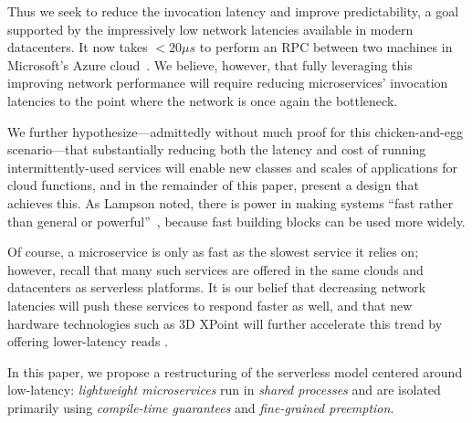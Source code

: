 Thus we seek to reduce the invocation latency and improve predictability, a
goal supported by the impressively low network latencies available in
modern datacenters. It
now takes $<20\mu{}s$ to perform an RPC between two machines in Microsoft's Azure
cloud~\cite{www-firestone-azure-latency}.    We believe, however, that fully leveraging this
improving network performance will require reducing microservices' invocation
latencies to the point where the network is once again the bottleneck.

We further hypothesize---admittedly without much proof for this chicken-and-egg
scenario---that substantially reducing both the latency and cost of running
intermittently-used services will enable new classes and scales of applications
for cloud functions, and in the remainder of this paper, present a design that
achieves this.  As Lampson noted, there is power in making systems 
``fast rather than general or powerful''~\cite{Lampson1983}, because fast
building blocks can be used more widely.

Of course, a microservice is only as fast as the slowest service it relies
on; however, recall that many such services are offered in the same clouds and
datacenters as serverless platforms.  It is our belief that decreasing network
latencies will push these services to respond faster as well, and that new hardware
technologies such as 3D XPoint will further accelerate this trend by offering
lower-latency reads .

In this paper, we propose a restructuring of the serverless model centered around
low-latency: \textit{lightweight microservices} run in \textit{shared processes}
and are isolated primarily using \textit{compile-time guarantees} and
\textit{fine-grained preemption}.



